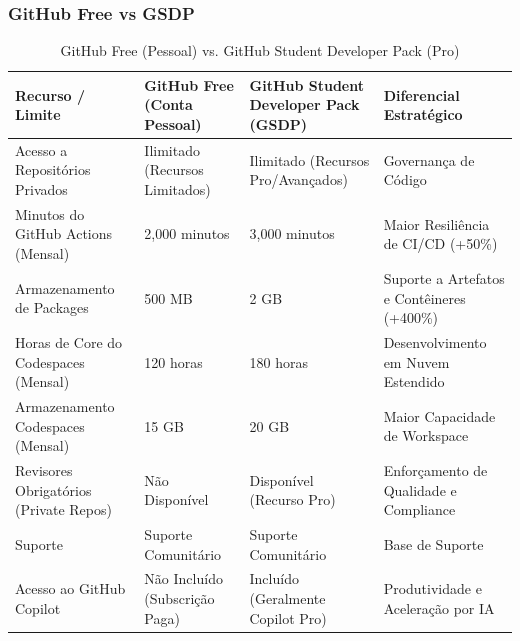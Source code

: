 \subsubsection{GitHub Free vs GSDP}
\begin{table}[h!]
    \centering
    \begin{tabularx}{\textwidth}{|p{3cm}|p{3cm}|p{3cm}|X|}
        \hline
        \textbf{Recurso / Limite} & \textbf{GitHub Free (Conta Pessoal)} & \textbf{GitHub Student Developer Pack (GSDP)} & \textbf{Diferencial Estratégico} \\
        \hline
        Acesso a Repositórios Privados & Ilimitado (Recursos Limitados) & Ilimitado (Recursos Pro/Avançados) & Governança de Código \\
        \hline
        Minutos do GitHub Actions (Mensal) & 2,000 minutos & 3,000 minutos & Maior Resiliência de CI/CD (+50\%) \\
        \hline
        Armazenamento de Packages & 500 MB & 2 GB & Suporte a Artefatos e Contêineres (+400\%) \\
        \hline
        Horas de Core do Codespaces (Mensal) & 120 horas & 180 horas & Desenvolvimento em Nuvem Estendido \\
        \hline
        Armazenamento Codespaces (Mensal) & 15 GB & 20 GB & Maior Capacidade de Workspace \\
        \hline
        Revisores Obrigatórios (Private Repos) & Não Disponível & Disponível (Recurso Pro) & Enforçamento de Qualidade e Compliance \\
        \hline
        Suporte & Suporte Comunitário & Suporte Comunitário & Base de Suporte \\
        \hline
        Acesso ao GitHub Copilot & Não Incluído (Subscrição Paga) & Incluído (Geralmente Copilot Pro) & Produtividade e Aceleração por IA \\
        \hline
    \end{tabularx}
    \caption{GitHub Free (Pessoal) vs. GitHub Student Developer Pack (Pro)}
    \label{tab:core_comparison}
\end{table}
\par
\newpage
